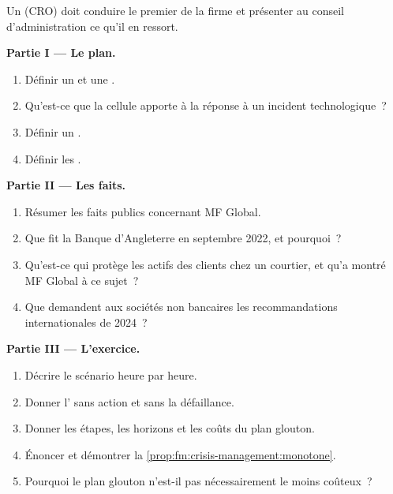 \begin{problem}\label{pb:fm:crisis-management:1}
Un  (CRO) doit conduire le premier  de la firme et présenter au conseil d'administration ce qu'il en ressort.

\medskip\noindent\textbf{Partie I --- Le plan.}
\begin{enumerate}
\item Définir un  et une .
\item Qu'est-ce que la cellule apporte à la réponse à un incident technologique~?
\item Définir un .
\item Définir les .
\end{enumerate}

\medskip\noindent\textbf{Partie II --- Les faits.}
\begin{enumerate}[resume]
\item Résumer les faits publics concernant MF Global.
\item Que fit la Banque d'Angleterre en septembre 2022, et pourquoi~?
\item Qu'est-ce qui protège les actifs des clients chez un courtier, et qu'a montré MF Global à ce sujet~?
\item Que demandent aux sociétés non bancaires les recommandations internationales de 2024~?
\end{enumerate}

\medskip\noindent\textbf{Partie III --- L'exercice.}
\begin{enumerate}[resume]
\item Décrire le scénario heure par heure.
\item Donner l' sans action et sans la défaillance.
\item Donner les étapes, les horizons et les coûts du plan glouton.
\item Énoncer et démontrer la \cref{prop:fm:crisis-management:monotone}.
\item Pourquoi le plan glouton n'est-il pas nécessairement le moins coûteux~?
\end{enumerate}


\end{problem}
